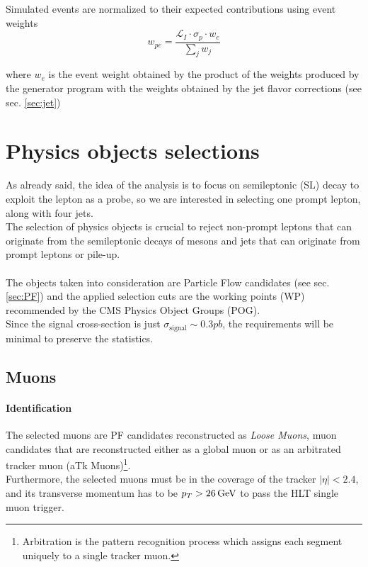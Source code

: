 Simulated events are normalized to
their expected contributions using event weights 
\begin{equation}
    w_{pe}=\frac{\mathcal{L}_I \cdot \sigma_p \cdot w_{e} }{\sum_j w_{j}}
\end{equation}

where $w_{e}$ is the event weight obtained by the product of the weights produced by the generator program with the weights obtained by the jet flavor corrections (see sec. \ref{sec:jet})   

\section{Physics objects selections}
As already said, the idea of the analysis is to focus on semileptonic (SL) decay to exploit the lepton as a probe, so we are interested in selecting one prompt lepton, along with four jets.\\
The selection of physics objects is crucial to reject non-prompt leptons that can originate from the semileptonic decays of mesons and jets that can originate from prompt leptons or pile-up.\\
\\
The objects taken into consideration are Particle Flow candidates (see sec. \ref{sec:PF}) and the applied selection cuts are the working points (WP) recommended by the CMS Physics Object Groups (POG).\\
Since the signal cross-section is just $\sigma_{\text{signal}}\sim 0.3 pb$, the requirements will be minimal to preserve the statistics. 
\subsection{Muons}
\paragraph*{Identification}
The selected muons are PF candidates reconstructed as \emph{Loose Muons}, \ie muon candidates that are reconstructed either as a global muon or as an arbitrated tracker muon (aTk Muons)\footnote{Arbitration is the pattern recognition process which assigns each segment uniquely to a single tracker muon.}.\\
Furthermore, the selected muons must be in the coverage of the tracker $|\eta|<2.4$, and its transverse momentum has to be $p_T>26{\,\text{Ge\hspace{-.08em}V}}$ to pass the HLT single muon trigger. 
